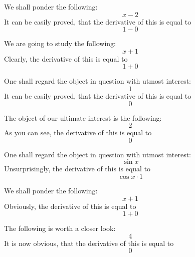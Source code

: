 \documentclass{article}
\begin{document}
We shall ponder the following:
\begin{equation}
x - 2 
\end{equation}
It can be easily proved, that the derivative of this is equal to
\begin{equation}
1 - 0 
\end{equation}

We are going to study the following:
\begin{equation}
x + 1 
\end{equation}
Clearly, the derivative of this is equal to
\begin{equation}
1 + 0 
\end{equation}

One shall regard the object in question with utmost interest:
\begin{equation}
1 
\end{equation}
It can be easily proved, that the derivative of this is equal to
\begin{equation}
0 
\end{equation}

The object of our ultimate interest is the following:
\begin{equation}
2 
\end{equation}
As you can see, the derivative of this is equal to
\begin{equation}
0 
\end{equation}

One shall regard the object in question with utmost interest:
\begin{equation}
\sin x 
\end{equation}
Unsurprisingly, the derivative of this is equal to
\begin{equation}
\cos x \cdot 1 
\end{equation}

We shall ponder the following:
\begin{equation}
x + 1 
\end{equation}
Obviously, the derivative of this is equal to
\begin{equation}
1 + 0 
\end{equation}

The following is worth a closer look:
\begin{equation}
4 
\end{equation}
It is now obvious, that the derivative of this is equal to
\begin{equation}
0 
\end{equation}
\end{document}
